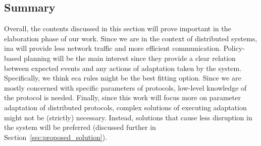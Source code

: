 \subsection{Summary}
\label{ssec:summary}
\par Overall, the contents discussed in this section will prove important in the elaboration phase of our work. Since we are in the context of distributed systems, \gls{ina} will provide less network traffic and more efficient communication. Policy-based planning will be the main interest since they provide a clear relation between expected events and any actions of adaptation taken by the system. Specifically, we think \gls{eca} rules might be the best fitting option. Since we are mostly concerned with specific parameters of protocols, low-level knowledge of the protocol is needed. Finally, since this work will focus more on parameter adaptation of distributed protocols, complex solutions of executing adaptation might not be (strictly) necessary. Instead, solutions that cause less disruption in the system will be preferred (discussed further in Section~\ref{sec:proposed_solution}).

